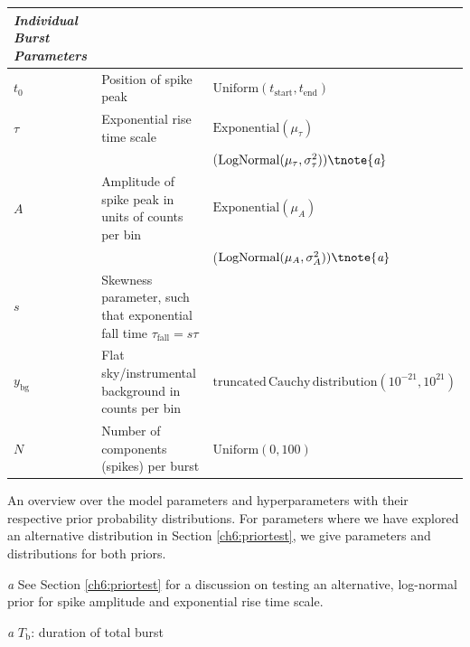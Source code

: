 \documentclass[12pt]{emulateapj}
\newcommand{\counts}{y}
\begin{document}
\begin{table}[hbtp]
\begin{threeparttable}
\begin{tabularx}{\textwidth}{p{2.0cm}p{10.0cm}X}
\it{Individual Burst Parameters} && \\ \midrule
$t_0$ & Position of spike peak & $\mathrm{Uniform}(t_{\mathrm{start}}, t_{\mathrm{end}})$ \\
$\tau$ & Exponential rise time scale & $\mathrm{Exponential}(\mu_\tau)$ \\
 && ($\mathrm{LogNormal}(\mu_\tau, \sigma^2_{\tau}))\tnote{\emph{a}} $ \\
$A$ & Amplitude of spike peak in units of counts per bin &$\mathrm{Exponential}(\mu_A)$ \\
 && ($\mathrm{LogNormal}(\mu_A, \sigma^2_{A}))\tnote{\emph{a}} $ \\ 
$s$ & Skewness parameter, such that exponential fall time $\tau_{\mathrm{fall}} = s\tau$ & \\
$\counts_{\mathrm{bg}}$ & Flat sky/instrumental background in counts per bin & $\mathrm{truncated\, Cauchy\, distribution}(10^{-21}, 10^{21})$ \\
$N$ & Number of components (spikes) per burst & $\mathrm{Uniform}(0,100)$  \\\bottomrule
\end{tabularx}
   \begin{tablenotes}
      \item{An overview over the model parameters and hyperparameters with their respective prior probability distributions. For parameters where we have explored an alternative distribution in Section 
\ref{ch6:priortest}, we give parameters and distributions for both priors.}
     \item[\emph{a}]{See Section \ref{ch6:priortest} for a discussion on testing an alternative, log-normal prior for spike amplitude and exponential rise time scale.}
     \item[\emph{a}]{$T_\mathrm{b}$: duration of total burst}
\end{tablenotes}
\end{threeparttable}
\label{tab:priortable}
\end{table}
\end{document}
